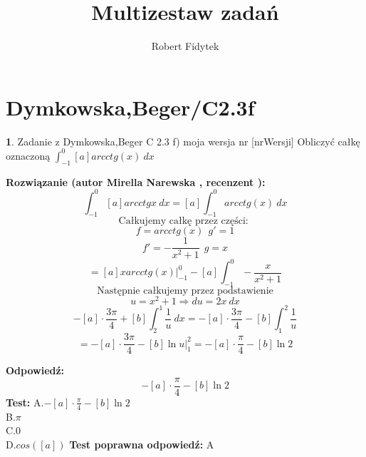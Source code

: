 \documentclass[12pt, a4paper]{article}
\title{Multizestaw zadań}
\author{Robert Fidytek}
\date{}
\theoremstyle{definition} %
\newtheorem{zad}{}
\newcommand{\kategoria}[1]{\section{#1}} %
\newcommand{\zadStart}[1]{\begin{zad}#1\newline} %
\newcommand{\zadStop}{\end{zad}}   %
\newcommand{\rozwStart}[2]{\noindent \textbf{Rozwiązanie (autor #1 , recenzent #2): }\newline} %
\newcommand{\odpStart}{\noindent \textbf{Odpowiedź:}\newline}    %
\newcommand{\odpStop}{\newline}                                             %
\newcommand{\testStart}{\noindent \textbf{Test:}\newline} %
\newcommand{\testStop}{\newline} %
\newcommand{\kluczStart}{\noindent \textbf{Test poprawna odpowiedź:}\newline} %
\newcommand{\kluczStop}{\newline} %
\begin{document}
\maketitle



\kategoria{Dymkowska,Beger/C2.3f}
\zadStart{Zadanie z Dymkowska,Beger C 2.3 f) moja wersja nr [nrWersji]}
Obliczyć całkę oznaczoną $\displaystyle \int_{-1}^{0} [a]arcctg(x) \ dx $
\zadStop
\rozwStart{Mirella Narewska}{}
$$\int_{-1}^{0} [a]arcctg{x}  \ dx = [a]\int_{-1}^{0} arcctg(x) \ dx $$
$$\text{Całkujemy całkę przez części: }$$
$$f=arcctg(x) \ \ g'=1$$
$$f'=-\frac{1}{x^{2}+1} \ \ g=x$$
$$=[a]xarcctg(x)|_{-1}^{0} -[a]\int_{-1}^{0} -\frac{x}{x^{2}+1}$$
$$\text{Następnie całkujemy przez podstawienie}$$
$$u=x^2+1 \Rightarrow du=2x \ dx$$
$$-[a]\cdot\frac{3\pi}{4} + [b]\int_{2}^{1} \frac{1}{u} \ dx=-[a]\cdot\frac{3\pi}{4}-[b]\int_{1}^{2} \frac{1}{u}$$
$$=-[a]\cdot\frac{3\pi}{4} -[b]\ln{u}|_{1}^{2}=-[a]\cdot\frac{\pi}{4}-[b]\ln{2}$$

\odpStart
$$-[a]\cdot\frac{\pi}{4}-[b]\ln{2}$$
\odpStop
\testStart
A.$-[a]\cdot\frac{\pi}{4}-[b]\ln{2}$
\\
B.$\pi$
\\
C.$0$
\\
D.$cos([a])$
\testStop
\kluczStart
A
\kluczStop
\end{document}
